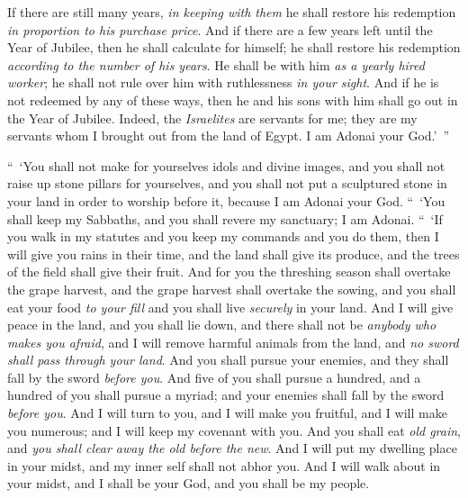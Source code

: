 \begin{biblechapter}
\verse If there are still many years, \textit{in keeping with them} he shall restore his redemption \textit{in proportion to his purchase price}.
\verse And if there are a few years left until the Year of Jubilee, then he shall calculate for himself; he shall restore his redemption \textit{according to the number of his years}.
\verse He shall be with him \textit{as a yearly hired worker}; he shall not rule over him with ruthlessness \textit{in your sight}.
\verse And if he is not redeemed by any of these ways, then he and his sons with him shall go out in the Year of Jubilee.
\verse Indeed, the \textit{Israelites} are servants for me; they are my servants whom I brought out from the land of Egypt. I am Adonai your God.’ ”
\end{biblechapter}

\begin{biblechapter} %
 “ ‘You shall not make for yourselves idols and divine images, and you shall not raise up stone pillars for yourselves, and you shall not put a sculptured stone in your land in order to worship before it, because I am Adonai your God.
\verse “ ‘You shall keep my Sabbaths, and you shall revere my sanctuary; I am Adonai.
\verse “ ‘If you walk in my statutes and you keep my commands and you do them,
\verse then I will give you rains in their time, and the land shall give its produce, and the trees of the field shall give their fruit.
\verse And for you the threshing season shall overtake the grape harvest, and the grape harvest shall overtake the sowing, and you shall eat your food \textit{to your fill} and you shall live \textit{securely} in your land.
\verse And I will give peace in the land, and you shall lie down, and there shall not be \textit{anybody who makes you afraid}, and I will remove harmful animals from the land, and \textit{no sword shall pass through your land}.
\verse And you shall pursue your enemies, and they shall fall by the sword \textit{before you}.
\verse And five of you shall pursue a hundred, and a hundred of you shall pursue a myriad; and your enemies shall fall by the sword \textit{before you}.
\verse And I will turn to you, and I will make you fruitful, and I will make you numerous; and I will keep my covenant with you.
\verse And you shall eat \textit{old grain}, and \textit{you shall clear away the old before the new}.
\verse And I will put my dwelling place in your midst, and my inner self shall not abhor you.
\verse And I will walk about in your midst, and I shall be your God, and you shall be my people.

\end{biblechapter}
